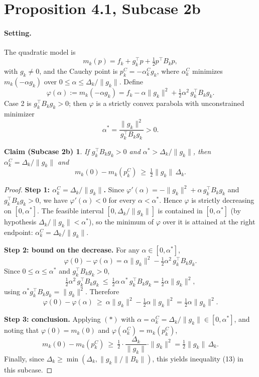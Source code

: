 \documentclass[11pt]{article}
\newtheorem*{claim}{Claim (Subcase 2b)}
\begin{document}
\section*{Proposition 4.1, Subcase 2b}

\paragraph{Setting.} The quadratic model is
\[
m_k(p) = f_k + g_k^\top p + \tfrac12 p^\top B_k p ,
\]
with $g_k \neq 0$, and the Cauchy point is $p_k^C = -\alpha_k^C g_k$, where
$\alpha_k^C$ minimizes $m_k(-\alpha g_k)$ over $0 \le \alpha \le \Delta_k/\|g_k\|$.
Define
\[
\varphi(\alpha) := m_k(-\alpha g_k) = f_k - \alpha \|g_k\|^2 + \tfrac12 \alpha^2\, g_k^\top B_k g_k .
\]
Case 2 is $g_k^\top B_k g_k > 0$; then $\varphi$ is a strictly convex parabola with
unconstrained minimizer
\[
\alpha^* = \frac{\|g_k\|^2}{g_k^\top B_k g_k} > 0 .
\]

\begin{claim}
If $g_k^\top B_k g_k > 0$ and $\alpha^* > \Delta_k/\|g_k\|$, then
$\alpha_k^C = \Delta_k/\|g_k\|$ and
\[
m_k(0) - m_k(p_k^C) \ \ge\ \tfrac12 \|g_k\|\,\Delta_k .
\]
\end{claim}

\begin{proof}
\textbf{Step 1: $\alpha_k^C = \Delta_k/\|g_k\|$.}
Since $\varphi'(\alpha) = -\|g_k\|^2 + \alpha\, g_k^\top B_k g_k$ and $g_k^\top B_k g_k>0$,
we have $\varphi'(\alpha) < 0$ for every $\alpha < \alpha^*$. Hence $\varphi$ is strictly
decreasing on $[0,\alpha^*]$. The feasible interval $[0, \Delta_k/\|g_k\|]$ is contained in
$[0,\alpha^*]$ (by hypothesis $\Delta_k/\|g_k\| < \alpha^*$), so the minimum of $\varphi$ over it
is attained at the right endpoint: $\alpha_k^C = \Delta_k/\|g_k\|$.

\textbf{Step 2: bound on the decrease.}
For any $\alpha \in [0,\alpha^*]$,
\[
\varphi(0) - \varphi(\alpha) = \alpha \|g_k\|^2 - \tfrac12 \alpha^2\, g_k^\top B_k g_k .
\]
Since $0 \le \alpha \le \alpha^*$ and $g_k^\top B_k g_k > 0$,
\[
\tfrac12 \alpha^2\, g_k^\top B_k g_k \ \le\ \tfrac12 \alpha\, \alpha^*\, g_k^\top B_k g_k
= \tfrac12 \alpha \|g_k\|^2 ,
\]
using $\alpha^* g_k^\top B_k g_k = \|g_k\|^2$. Therefore
\[
\varphi(0) - \varphi(\alpha) \ \ge\ \alpha\|g_k\|^2 - \tfrac12 \alpha\|g_k\|^2 = \tfrac12 \alpha \|g_k\|^2 .
\tag{$\ast$}
\]

\textbf{Step 3: conclusion.}
Applying $(\ast)$ with $\alpha = \alpha_k^C = \Delta_k/\|g_k\| \in [0,\alpha^*]$, and noting that
$\varphi(0)=m_k(0)$ and $\varphi(\alpha_k^C) = m_k(p_k^C)$,
\[
m_k(0) - m_k(p_k^C) \ \ge\ \tfrac12 \cdot \frac{\Delta_k}{\|g_k\|}\cdot \|g_k\|^2
= \tfrac12 \|g_k\|\,\Delta_k .
\]
Finally, since $\Delta_k \ge \min\!\left(\Delta_k, \|g_k\|/\|B_k\|\right)$, this yields
inequality (13) in this subcase.
\end{proof}
\end{document}

